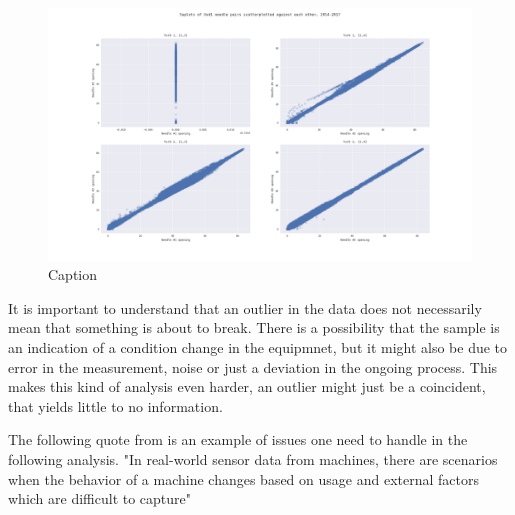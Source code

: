     
    \begin{figure}
        \centering
        \includegraphics[width=\textwidth]{report/figures/analysis/uvdal1/uvd1_scatterplot_all_needels.png}
        \caption{Caption}
        \label{fig:my_label}
    \end{figure}
    
    
    
    It is important to understand that an outlier in the data does not necessarily mean that something is about to break. There is a possibility that the sample is an indication of a condition change in the equipmnet, but it might also be due to error in the measurement, noise or just a deviation in the ongoing process. This makes this kind of analysis even harder, an outlier might just be a coincident, that yields little to no information. 
    
    The following quote from \cite{Malhotra2016} is an example of issues one need to handle in the following analysis. "In real-world sensor data from machines, there are scenarios when the behavior of a machine changes based on usage and external factors which are difficult to capture" 
